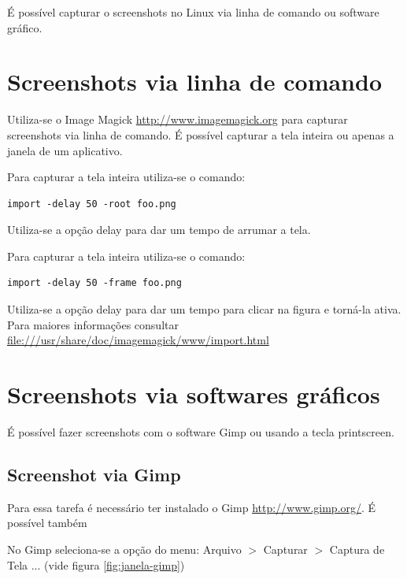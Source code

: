 \documentclass[12pt,brazil]{book}
\begin{document}
É possível capturar o screenshots no Linux via linha de comando ou
software gráfico.

\section{Screenshots via linha de comando}
\label{sec:scre-via-linha}

Utiliza-se o Image Magick \url{http://www.imagemagick.org} para
capturar screenshots via linha de comando. É possível capturar a tela
inteira ou apenas a janela de um aplicativo.

Para capturar a tela inteira utiliza-se o comando:

\begin{verbatim}
import -delay 50 -root foo.png
\end{verbatim}

Utiliza-se a opção delay para dar um tempo de arrumar a tela.

Para capturar a tela inteira utiliza-se o comando:

\begin{verbatim}
import -delay 50 -frame foo.png
\end{verbatim}

Utiliza-se a opção delay para dar um tempo para clicar na figura e
torná-la ativa. Para maiores informações consultar
\url{file:///usr/share/doc/imagemagick/www/import.html}

\section{Screenshots via softwares gráficos}
\label{sec:scre-via-softw}

É possível fazer screenshots com o software Gimp ou usando a tecla
printscreen.

\subsection{Screenshot via Gimp}
\label{sec:screenshot-via-gimp}

Para essa tarefa é necessário ter instalado o Gimp
\url{http://www.gimp.org/}. É possível também 

No Gimp seleciona-se a opção do menu: Arquivo $>$ Capturar $>$ Captura
de Tela ... (vide figura \ref{fig:janela-gimp})
\end{document}
